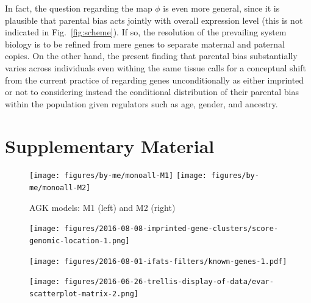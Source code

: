 \documentclass[letterpaper]{article}
\begin{document}
In fact, the question regarding the map \(\phi\) is even more general, since
it is plausible that parental bias acts jointly with overall expression level
(this is not indicated in Fig.~\ref{fig:scheme}).  If so, the resolution of
the prevailing system biology is to be refined from mere genes to separate
maternal and paternal copies.  On the other hand, the present finding that
parental bias substantially varies across individuals even withing the same
tissue calls for a conceptual shift from the current practice of regarding
genes unconditionally as either imprinted or not to considering instead the
conditional distribution of their parental bias within the population given
regulators such as age, gender, and ancestry.



\section{Supplementary Material}

\newpage


\setcounter{figure}{0}
\makeatletter 
\renewcommand{\thefigure}{S\@arabic\c@figure}
\makeatother

\begin{figure}
\begin{center}
\texttt{[image: figures/by-me/monoall-M1]}
\hspace{\fill}
\texttt{[image: figures/by-me/monoall-M2]}
\end{center}
\caption{AGK models: M1 (left) and M2 (right)}
\label{fig:agk}
\end{figure}

\begin{figure}
\begin{center}
\texttt{[image: figures/2016-08-08-imprinted-gene-clusters/score-genomic-location-1.png]}
\end{center}
\caption{}
\label{fig:clusters}
\end{figure}

\begin{figure}
\begin{center}
\texttt{[image: figures/2016-08-01-ifats-filters/known-genes-1.pdf]}
\caption{}
\label{fig:known-genes}
\end{center}
\end{figure}

\begin{figure}
\begin{center}
\texttt{[image: figures/2016-06-26-trellis-display-of-data/evar-scatterplot-matrix-2.png]}
\end{center}
\caption{}
\label{fig:predictor-associations}
\end{figure}
\end{document}
